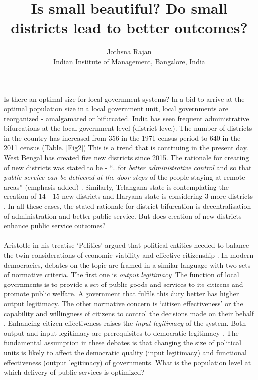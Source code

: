 \documentclass[12pt, a4paper]{article}
\title{Is small beautiful? Do small districts lead to better outcomes?}
\author{Jothsna Rajan \\
	\small{Indian Institute of Management, Bangalore, India}}
\begin{document}
	\maketitle
\paragraph{} Is there an optimal size for local government systems? In a bid to arrive at the optimal population size in a local government unit, local governments are reorganized - amalgamated or bifurcated. India has seen frequent administrative bifurcations at the local government level (district level). The number of districts in the country has increased from 356 in the 1971 census period to 640 in the 2011 census (Table. \ref{Fig2}) This is a trend that is continuing in the present day. West Bengal has created five new districts since 2015. The rationale for creating of new districts was stated to be - ``...for \textit{better administrative control} and so that \textit{public service can be delivered at the door steps} of the people staying at remote areas'' (emphasis added) \parencite{Mamata}. Similarly, Telangana state is contemplating the creation of 14 - 15 new districts \parencite{Telengana} and Haryana state is considering 3 more districts \parencite{Haryana}. In all these cases, the stated rationale for district bifurcation is decentralisation of administration and better public service. But does creation of new districts enhance public service outcomes?
\paragraph{} Aristotle in his treatise `Politics' argued that political entities needed to balance the twin considerations of economic viability and effective citizenship \parencite{aristotle_politics_1984}. In modern democracies, debates on the topic are framed in a similar language with two sets of normative criteria. The first one is \textit{output legitimacy}. The function of local governments is to provide a set of public goods and services to its citizens and promote public welfare. A government that fulfils this duty better has higher output legitimacy. The other normative concern is `citizen effectiveness' or the capability and willingness of citizens to control the decisions made on their behalf \parencite{dahl_size_1973}. Enhancing citizen effectiveness raises the \textit{input legitimacy} of the system. Both output and input legitimacy are prerequisites to democratic legitimacy \parencite{scharpf_governing_1999}. The fundamental assumption in these debates is that changing the size of political units is likely to affect the democratic quality (input legitimacy) and functional effectiveness (output legitimacy) of governments. What is the population level at which delivery of public services is optimized?
\end{document}
